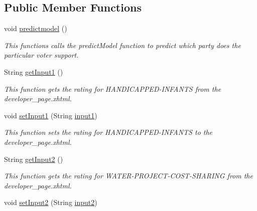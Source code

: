 \subsection*{Public Member Functions}
\begin{DoxyCompactItemize}
\item 
void \hyperlink{classorg_1_1jboss_1_1as_1_1quickstarts_1_1greeter_1_1web_1_1_general_controller_ac7216ff7cbb403de6ae9573c61c1c7ee}{predictmodel} ()
\begin{DoxyCompactList}\small\item\em This functions calls the predict\+Model function to predict which party does the particular voter support. \end{DoxyCompactList}\item 
String \hyperlink{classorg_1_1jboss_1_1as_1_1quickstarts_1_1greeter_1_1web_1_1_general_controller_a5c23ab308fbd8c66791a3df62b2c8e16}{get\+Input1} ()
\begin{DoxyCompactList}\small\item\em This function gets the rating for H\+A\+N\+D\+I\+C\+A\+P\+P\+E\+D-\/\+I\+N\+F\+A\+N\+TS from the developer\+\_\+page.\+xhtml. \end{DoxyCompactList}\item 
void \hyperlink{classorg_1_1jboss_1_1as_1_1quickstarts_1_1greeter_1_1web_1_1_general_controller_a9b68a4356c2b783f0bfb04934afde689}{set\+Input1} (String \hyperlink{classorg_1_1jboss_1_1as_1_1quickstarts_1_1greeter_1_1web_1_1_general_controller_a020618ee6d30d297000ab00bb1112d59}{input1})
\begin{DoxyCompactList}\small\item\em This function sets the rating for H\+A\+N\+D\+I\+C\+A\+P\+P\+E\+D-\/\+I\+N\+F\+A\+N\+TS to the developer\+\_\+page.\+xhtml. \end{DoxyCompactList}\item 
String \hyperlink{classorg_1_1jboss_1_1as_1_1quickstarts_1_1greeter_1_1web_1_1_general_controller_a3323e828092c49671a9076a31fd401ce}{get\+Input2} ()
\begin{DoxyCompactList}\small\item\em This function gets the rating for W\+A\+T\+E\+R-\/\+P\+R\+O\+J\+E\+C\+T-\/\+C\+O\+S\+T-\/\+S\+H\+A\+R\+I\+NG from the developer\+\_\+page.\+xhtml. \end{DoxyCompactList}\item 
void \hyperlink{classorg_1_1jboss_1_1as_1_1quickstarts_1_1greeter_1_1web_1_1_general_controller_a3b877ba2cf3f65eed4c4853a18b932a8}{set\+Input2} (String \hyperlink{classorg_1_1jboss_1_1as_1_1quickstarts_1_1greeter_1_1web_1_1_general_controller_adb26a9d5f3a4ebede1020dca01fa1d1e}{input2})

\end{DoxyCompactItemize}

